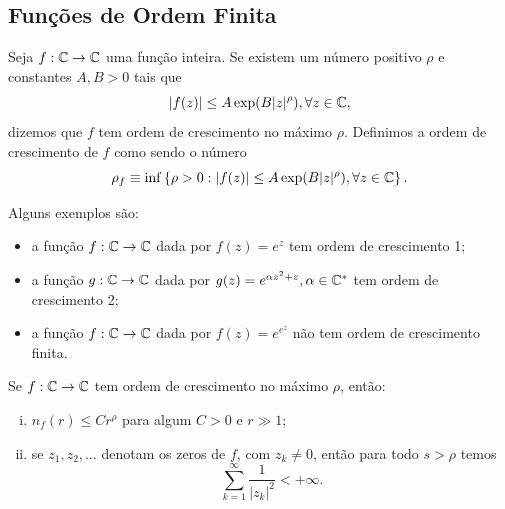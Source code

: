     \subsection{Funções de Ordem Finita}
    \begin{definicao}
    \label{def:ordem-func}
        Seja $f:\mathbb{C}\to\mathbb{C}$ uma função inteira. Se existem um número positivo $\rho$
        e constantes $A,B>0$ tais que
        \begin{equation*}
            |f(z)| \leq A\exp(B|z|^{\rho}), \forall z\in\mathbb{C},
        \end{equation*}
        dizemos que $f$ tem ordem de crescimento no máximo $\rho$. Definimos a
        ordem de crescimento de $f$ como sendo o número
        \begin{equation*}
            \rho_f \equiv 
            \inf \left\{ \rho > 0 : 
            |f(z)| \leq A\exp(B|z|^{\rho}), \forall z\in\mathbb{C} \right\}.
        \end{equation*}
    \end{definicao}
    Alguns exemplos são:
    \begin{itemize}
        \item a função $f:\mathbb{C}\to\mathbb{C}$ dada por $f(z) = e^z$ tem ordem de crescimento 1;
        \item a função $g:\mathbb{C}\to\mathbb{C}$ dada por $g(z) = e^{\alpha z^2 + z}, \alpha\in\mathbb{C}^*$
        tem ordem de crescimento 2;
        \item a função $f:\mathbb{C}\to\mathbb{C}$ dada por $f(z) = e^{e^z}$ não tem ordem de
        crescimento finita.
    \end{itemize}
    \begin{teorema}
    \label{teo:est-num-zeros}
        Se $f:\mathbb{C}\to\mathbb{C}$ tem ordem de crescimento no máximo $\rho$, então:
        \begin{enumerate}[(i)]
            \item $n_f(r) \leq Cr^{\rho}$ para algum $C>0$ e $r\gg 1$;
            \item se $z_1, z_2, \dots$ denotam os zeros de $f$, com $z_k\neq 0$,
            então para todo $s > \rho$ temos
            \begin{equation*}
                \sum_{k=1}^{\infty} \frac{1}{|z_k|^2} < + \infty.
            \end{equation*}
        \end{enumerate}
    \end{teorema}
